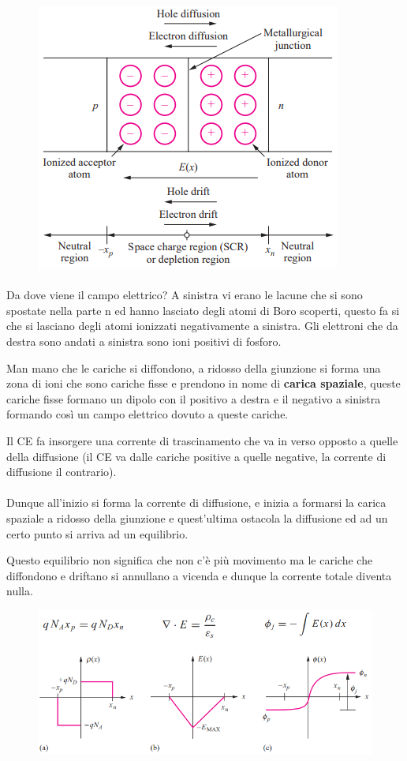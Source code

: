 \begin{figure}[htbp]
    \centering
    \includegraphics[width=0.45\linewidth]{img/corrente_spaziale.png}  
    
\end{figure}
\paragraph{}
Da dove viene il campo elettrico? A sinistra vi erano le lacune che si sono spostate nella parte n ed hanno lasciato degli atomi di Boro scoperti, questo fa si che si lasciano degli atomi ionizzati negativamente a sinistra. Gli elettroni che da destra sono andati a sinistra sono ioni positivi di fosforo.

Man mano che le cariche si diffondono, a ridosso della giunzione si forma una zona di ioni che sono cariche fisse e prendono in nome di \textbf{carica spaziale}, queste cariche fisse formano un dipolo con il positivo a destra e il negativo a sinistra formando così un campo elettrico dovuto a queste cariche.

Il CE fa insorgere una corrente di trascinamento che va in verso opposto a quelle della diffusione (il CE va dalle cariche positive a quelle negative, la corrente di diffusione il contrario).

\paragraph{}
Dunque all'inizio si forma la corrente di diffusione, e inizia a formarsi la carica spaziale a ridosso della giunzione e quest'ultima ostacola la diffusione ed ad un certo punto si arriva ad un equilibrio.

Questo equilibrio non significa che non c'è più movimento ma le cariche che diffondono e driftano si annullano a vicenda e dunque la corrente totale diventa nulla.

\begin{figure}[htbp]
    \centering
    \includegraphics[width=0.9\linewidth]{img/carica_sapzoale_2.png}   
    
\end{figure}

